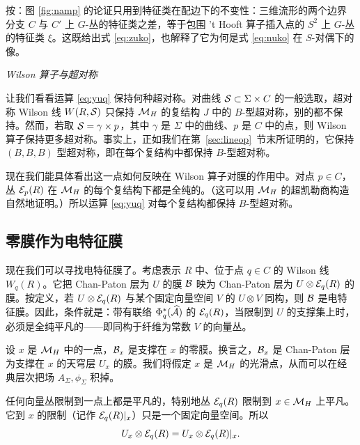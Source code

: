 \begin{yizhu}[物理图像]
按：图 \ref{fig:namp} 的论证只用到特征类在配边下的不变性：三维流形的两个边界分支 $C$ 与 $C'$ 上 $G$-丛的特征类之差，等于包围 't Hooft 算子插入点的 $S^2$ 上 $G$-丛的特征类 $\xi$。这既给出式 \eqref{eq:zuko}，也解释了它为何是式 \eqref{eq:nuko} 在 $S$-对偶下的像。
\end{yizhu}

\par\medskip\emph{Wilson 算子与超对称}

让我们看看运算 \eqref{eq:yuq} 保持何种超对称。对曲线 ${\cal S}\subset \Sigma\times C$ 的一般选取，超对称 Wilson 线 $W(R,{\cal S})$ 只保持 $\MH$ 的复结构 $J$ 中的 $B$-型超对称，别的都不保持。然而，若取 ${\cal S}=\gamma\times p$，其中 $\gamma$ 是 $\Sigma$ 中的曲线、$p$ 是 $C$ 中的点，则 Wilson 算子保持更多超对称。事实上，正如我们在第~\ref{sec:lineop}~节末所证明的，它保持 $(B,B,B)$ 型超对称，即在每个复结构中都保持 $B$-型超对称。

现在我们能具体看出这一点如何反映在 Wilson 算子对膜的作用中。对点 $p\in C$，丛 ${\EUE}_p(R)$ 在 $\MH$ 的每个复结构下都是全纯的。（这可以用 $\MH$ 的超凯勒商构造自然地证明。）所以运算 \eqref{eq:yuq} 对每个复结构都保持 $B$-型超对称。

\subsection{零膜作为电特征膜}

\label{sec:zerobelectric}

现在我们可以寻找电特征膜了。考虑表示 $R$ 中、位于点 $q\in C$ 的 Wilson 线 $W_q(R)$。它把 Chan-Paton 层为 $U$ 的膜 ${\cal B}$ 映为 Chan-Paton 层为 $U\otimes {\EUE}_q(R)$ 的膜。按定义，若 $U\otimes {\EUE}_q(R)$ 与某个固定向量空间 $V$ 的 $U\otimes V$ 同构，则 ${\cal B}$ 是电特征膜。因此，条件就是：带有联络 $\Phi_q^*(\hat \CA)$ 的 ${\EUE}_q(R)$，当限制到 $U$ 的支撑集上时，必须是全纯平凡的——即同构于纤维为常数 $V$ 的向量丛。

设 $x$ 是 $\MH$ 中的一点，${\cal B}_x$ 是支撑在 $x$ 的零膜。换言之，${\cal B}_x$ 是 Chan-Paton 层为支撑在 $x$ 的天穹层 $U_x$ 的膜。我们将假定 $x$ 是 $\MH$ 的光滑点，从而可以在经典层次把场 $A_\Sigma,\phi_\Sigma$ 积掉。

任何向量丛限制到一点上都是平凡的，特别地丛 ${\EUE}_q(R)$ 限制到 $x\in \MH$ 上平凡。它到 $x$ 的限制（记作 ${\EUE}_q(R)|_x$）只是一个固定向量空间。所以
\setcounter{equation}{9}
\begin{equation}\label{eq:insto}
U_x\otimes {\EUE}_q(R)=U_x\otimes {\EUE}_q(R)|_x.
\end{equation}

